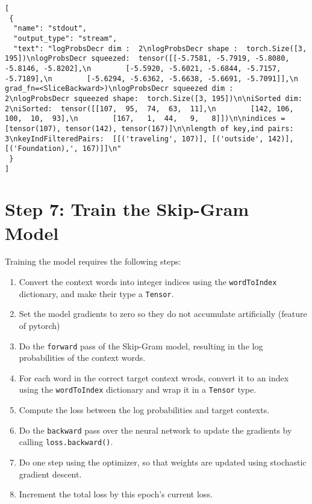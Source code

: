 \documentclass[
]{article}
\providecommand{\tightlist}{%
  \setlength{\itemsep}{0pt}\setlength{\parskip}{0pt}}
\begin{document}
\begin{verbatim}
[
 {
  "name": "stdout",
  "output_type": "stream",
  "text": "logProbsDecr dim :  2\nlogProbsDecr shape :  torch.Size([3, 195])\nlogProbsDecr squeezed:  tensor([[-5.7581, -5.7919, -5.8080, -5.8146, -5.8202],\n        [-5.5920, -5.6021, -5.6844, -5.7157, -5.7189],\n        [-5.6294, -5.6362, -5.6638, -5.6691, -5.7091]],\n       grad_fn=<SliceBackward>)\nlogProbsDecr squeezed dim :   2\nlogProbsDecr squeezed shape:  torch.Size([3, 195])\n\niSorted dim:  2\niSorted:  tensor([[107,  95,  74,  63,  11],\n        [142, 106, 100,  10,  93],\n        [167,   1,  44,   9,   8]])\n\nindices =  [tensor(107), tensor(142), tensor(167)]\n\nlength of key,ind pairs:  3\nkeyIndFilteredPairs:  [[('traveling', 107)], [('outside', 142)], [('Foundation),', 167)]]\n"
 }
]
\end{verbatim}

\hypertarget{step-7-train-the-skip-gram-model}{%
\section{Step 7: Train the Skip-Gram
Model}\label{step-7-train-the-skip-gram-model}}

Training the model requires the following steps:

\begin{enumerate}
\def\labelenumi{\arabic{enumi}.}
\tightlist
\item
  Convert the context words into integer indices using the
  \texttt{wordToIndex} dictionary, and make their type a
  \texttt{Tensor}.
\item
  Set the model gradients to zero so they do not accumulate artificially
  (feature of pytorch)
\item
  Do the \texttt{forward} pass of the Skip-Gram model,
  resulting in the log probabilities of the context words.
\item
  For each word in the correct target context wrods, convert it to an
  index using the \texttt{wordToIndex} dictionary and wrap
  it in a \texttt{Tensor} type.
\item
  Compute the loss between the log probabilities and target contexts.
\item
  Do the \texttt{backward} pass over the neural network to
  update the gradients by calling
  \texttt{loss.backward()}.
\item
  Do one step using the optimizer, so that weights are updated using
  stochastic gradient descent.
\item
  Increment the total loss by this epoch's current loss.
\end{enumerate}
\end{document}
